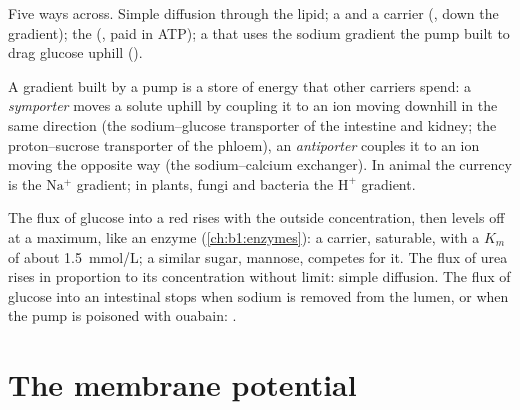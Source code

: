 \begin{omfigure}
{\small Five ways across. Simple diffusion through the lipid; a
 and a carrier (, down the gradient); the
 (, paid in ATP); a
 that uses the sodium gradient the pump built to drag glucose
uphill ().}
\end{omfigure}

\begin{proposition}\label{prop:b1:membranes-transport:secondary}
A gradient built by a pump is a store of energy that other carriers
spend: a \emph{symporter} moves a solute uphill by
coupling it to an ion moving downhill in the same direction (the
sodium--glucose transporter of the intestine and kidney; the
proton--sucrose transporter of the phloem), an
\emph{antiporter} couples it to an ion moving the
opposite way (the sodium--calcium exchanger). In animal  the
currency is the $\mathrm{Na^+}$ gradient; in plants, fungi and bacteria
the $\mathrm{H^+}$ gradient.
\end{proposition}

\begin{example}\label{ex:b1:membranes-transport:kinetics}
The flux of glucose into a red  rises with the outside
concentration, then levels off at a maximum, like an enzyme
(\cref{ch:b1:enzymes}): a carrier, saturable, with a $K_m$ of about
\qty{1.5}{mmol/L}; a similar sugar, mannose, competes for it. The flux
of urea rises in proportion to its concentration without limit: simple
diffusion. The flux of glucose into an intestinal  stops when
sodium is removed from the lumen, or when the pump is poisoned with
ouabain: .
\end{example}

\section{The membrane potential}


